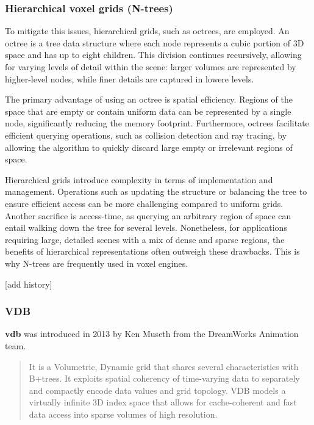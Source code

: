 \subsubsection{Hierarchical voxel grids (N-trees)}
To mitigate this issues, hierarchical grids, such as octrees, are employed. An octree is a tree data structure where each node represents a cubic portion of 3D space and has up to eight children. This division continues recursively, allowing for varying levels of detail within the scene: larger volumes are represented by higher-level nodes, while finer details are captured in lowere levels.

The primary advantage of using an octree is spatial efficiency. Regions of the space that are empty or contain uniform data can be represented by a single node, significantly reducing the memory footprint. Furthermore, octrees facilitate efficient querying operations, such as collision detection and ray tracing, by allowing the algorithm to quickly discard large empty or irrelevant regions of space.

Hierarchical grids introduce complexity in terms of implementation and management. Operations such as updating the structure or balancing the tree to ensure efficient access can be more challenging compared to uniform grids.
Another sacrifice is access-time, as querying an arbitrary region of space can entail walking down the tree for several levels.
Nonetheless, for applications requiring large, detailed scenes with a mix of dense and sparse regions, the benefits of hierarchical representations often outweigh these drawbacks. This is why N-trees are frequently used in voxel engines.

[add history]

\subsubsection{VDB}

\textbf{\acrshort{vdb}} was introduced in 2013 by Ken Museth\supercite{vdb2013} from the DreamWorks Animation team.
\begin{quote}
It is a Volumetric, Dynamic grid that shares several characteristics with B+trees.
It exploits spatial coherency of time-varying data to separately and compactly encode data values and grid topology.
VDB models a virtually infinite 3D index space that allows for cache-coherent and fast data access into sparse volumes of high resolution.
\end{quote}


